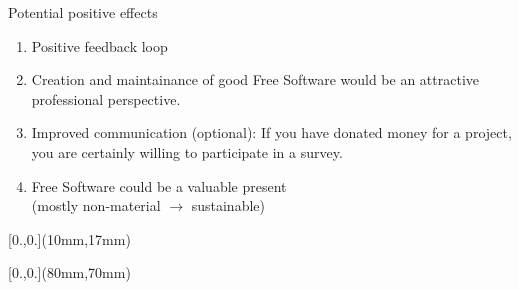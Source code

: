 \documentclass[t]{beamer}
\newcommand{\cst}[1]{{\usebeamercolor[fg]{structure}#1}}
\begin{document}
\begin{frame}[label=cm80]{\cst{Potential positive effects}}
 \vspace{-3mm}
\begin{enumerate}
\setlength\itemsep{0.5em}
 \item Positive feedback loop
 \vspace{27mm}

 \item<4-> Creation and maintainance of good Free Software would be an attractive professional perspective.
 \item<5-> Improved communication (optional): If you have donated money for a project, you are certainly willing to participate in a survey.
 \item<6-> Free Software could be a valuable present\\
 (mostly non-material $\rightarrow$ sustainable)
\end{enumerate}

\begin{textblock*}{\textwidth}[0.,0.](10mm,17mm)
\setlength{\breite}{0.9\textwidth}
\end{textblock*}

\begin{textblock*}{\textwidth}[0.,0.](80mm,70mm)
\end{textblock*}

\end{frame}
\end{document}
